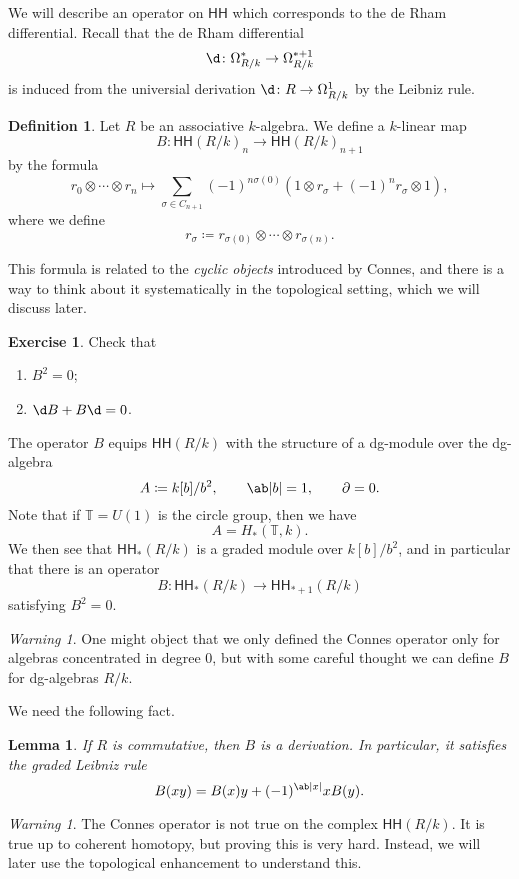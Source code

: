 \documentclass[10pt, oneside]{memoir}
\newtheorem{lem}[thm]{Lemma}
\theoremstyle{definition}
\newtheorem{defn}[thm]{Definition}
\newtheorem{exer}[thm]{Exercise}
\theoremstyle{remark}
\newtheorem{warn}[thm]{Warning}
\theoremstyle{plain}
\theoremstyle{definition}
\theoremstyle{remark}
\newcommand{\T}{\mathbb{T}}
\newcommand{\ms}[1]{\mathsf{#1}}
\newcommand{\1}{\mathbf{1}}
\newcommand{\2}{\mathbf{2}}
\newcommand{\3}{\mathbf{3}}
\newcommand{\HH}{\ms{HH}}
\begin{document}
We will describe an operator on $\HH$ which corresponds to the de Rham differential. Recall that the de Rham differential
\[ \d \colon \Omega^*_{R/k} \to \Omega^{*+1}_{R/k} \]
is induced from the universial derivation $\d \colon R \to \Omega^1_{R/k}$ by the Leibniz rule.

\begin{defn}
    Let $R$ be an associative $k$-algebra. We define a $k$-linear map
    \[ B \colon \HH(R/k)_n \to \HH(R/k)_{n+1} \]
    by the formula
    \[ r_0 \otimes \cdots \otimes r_n \mapsto \sum_{\sigma \in C_{n+1}} (-1)^{n\sigma(0)} (1 \otimes r_{\sigma} + (-1)^n r_{\sigma} \otimes 1), \]
    where we define
    \[ r_{\sigma} \coloneqq r_{\sigma(0)} \otimes \cdots \otimes r_{\sigma(n)}. \]
\end{defn}
This formula is related to the \textit{cyclic objects} introduced by Connes, and there is a way to think about it systematically in the topological setting, which we will discuss later.

\begin{exer}
    Check that
    \begin{enumerate}
        \item $B^2 = 0$;
        \item $\d B + B \d = 0$.
    \end{enumerate}
\end{exer}

The operator $B$ equips $\HH(R/k)$ with the structure of a dg-module over the dg-algebra
\[ A \coloneqq k[b]/b^2, \qquad \ab|b| = 1, \qquad \partial = 0. \]
Note that if $\T = U(1)$ is the circle group, then we have
\[ A = H_*(\T, k). \]
We then see that $\HH_*(R/k)$ is a graded module over $k[b]/b^2$, and in particular that there is an operator
\[ B \colon \HH_*(R/k) \to \HH_{*+1}(R/k) \]
satisfying $B^2 = 0$.

\begin{warn}
    One might object that we only defined the Connes operator only for algebras concentrated in degree $0$, but with some careful thought we can define $B$ for dg-algebras $R/k$.
\end{warn}

We need the following fact.
\begin{lem}
    If $R$ is commutative, then $B$ is a derivation. In particular, it satisfies the graded Leibniz rule
    \[ B(xy) = B(x) y + (-1)^{\ab|x|} x B(y). \]
\end{lem}

\begin{warn}
    The Connes operator is not true on the complex $\HH(R/k)$. It is true up to coherent homotopy, but proving this is very hard. Instead, we will later use the topological enhancement to understand this.
\end{warn}
\end{document}

